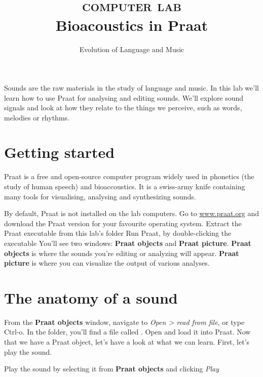 \documentclass[a4paper, 9pt]{article}
\title{\textsc{computer lab}\\ \textbf{Bioacoustics in Praat}}
\author{Evolution of Language and Music}
\begin{document}
\maketitle

\begin{goals}
Sounds are the raw materials in the study of language and music. In this
lab we'll learn how to use Praat for analysing and editing sounds. We'll
explore sound signals and look at how they relate to the things we
perceive, such as words, melodies or rhythms.
\end{goals}

\section{Getting started}\label{getting-started}

Praat is a free and open-source computer program widely used in
phonetics (the study of human speech) and bioaccoustics. It is a
swiss-army knife containing many tools for visualising, analysing and
synthesizing sounds.

\begin{exercise}
  \action By default, Praat is not installed on the lab computers. Go to 
  \url{www.praat.org} and download the Praat version for your favourite 
  operating system.
  \action Extract the Praat executable from this lab's folder
  \action Run Praat, by double-clicking the executable
  \action You'll see two windows: \textbf{Praat objects} and \textbf{Praat
  picture}. \textbf{Praat objects} is where the sounds you're editing or
  analyzing will appear. \textbf{Praat picture} is where you can visualize
  the output of various analyses.
\end{exercise}


\section{The anatomy of a sound}\label{the-anatomy-of-a-sound}

From the \textbf{Praat objects} window, navigate to \emph{Open
> read from file}, or type Ctrl-o. In the 
folder, you'll find a file called . Open and load it into
Praat. Now that we have a Praat object, let's have a look at what we can
learn. First, let's play the sound.

\begin{exercise}
\action Play the sound by selecting it from \textbf{Praat objects} and clicking \textit{Play}
\end{exercise}
\end{document}
